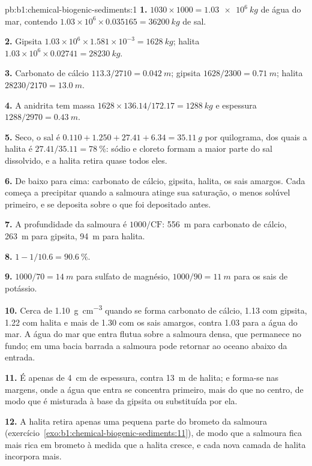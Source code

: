 \begin{solution}{pb:b1:chemical-biogenic-sediments:1}
\textbf{1.} $1030\times1000 = \qty{1.03e6}{kg}$ de água do mar, contendo
$1.03\times10^6\times0.035165 = \qty{36200}{kg}$ de sal.

\textbf{2.} Gipsita $1.03\times10^6\times1.581\times10^{-3} = \qty{1628}{kg}$;
halita $1.03\times10^6\times0.02741 = \qty{28230}{kg}$.

\textbf{3.} Carbonato de cálcio $113.3/2710 = \qty{0.042}{m}$; gipsita $1628/2300 =
\qty{0.71}{m}$; halita $28230/2170 = \qty{13.0}{m}$.

\textbf{4.} A anidrita tem massa $1628\times136.14/172.17 =
\qty{1288}{kg}$ e espessura $1288/2970 = \qty{0.43}{m}$.

\textbf{5.} Seco, o sal é $0.110 + 1.250 + 27.41 + 6.34 = \qty{35.11}{g}$ por
quilograma, dos quais a halita é $27.41/35.11 = \qty{78}{\%}$: sódio e cloreto
formam a maior parte do sal dissolvido, e a halita retira quase todos eles.

\textbf{6.} De baixo para cima: carbonato de cálcio, gipsita, halita, os sais amargos.
Cada  começa a precipitar quando a salmoura atinge sua saturação, o menos solúvel
primeiro, e se deposita sobre o que foi depositado antes.

\textbf{7.} A profundidade da salmoura é $1000/\mathrm{CF}$: \qty{556}{m} para carbonato de
cálcio, \qty{263}{m} para gipsita, \qty{94}{m} para halita.

\textbf{8.} $1 - 1/10.6 = \qty{90.6}{\%}$.

\textbf{9.} $1000/70 = \qty{14}{m}$ para sulfato de magnésio, $1000/90 = \qty{11}{m}$
para os sais de potássio.

\textbf{10.} Cerca de \qty{1.10}{g.cm^{-3}} quando se forma carbonato de cálcio, 1.13 com
gipsita, 1.22 com halita e mais de 1.30 com os sais amargos, contra 1.03 para a água do
mar. A água do mar que entra flutua sobre a salmoura densa, que permanece no fundo; em uma
bacia barrada a salmoura pode retornar ao oceano abaixo da entrada.

\textbf{11.} É apenas de \qty{4}{cm} de espessura, contra \qty{13}{m} de halita; e forma-se
nas margens, onde a água que entra se concentra primeiro, mais do que no centro, de modo que
é misturada à base da gipsita ou substituída por ela.

\textbf{12.} A halita retira apenas uma pequena parte do brometo da salmoura
(exercício~\ref{exo:b1:chemical-biogenic-sediments:11}), de modo que a salmoura fica mais
rica em brometo à medida que a halita cresce, e cada nova camada de halita incorpora mais.


\end{solution}
